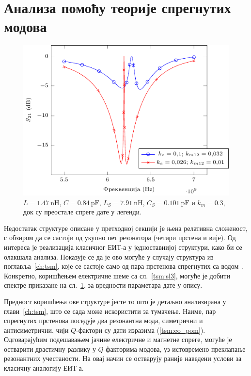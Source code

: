 \documentclass[main.tex]{subfiles}
\begin{document}
\section{Анализа помоћу теорије спрегнутих модова}%
\label{sec:analiza_pomotshu_teorije_spregnutikh_modova}

\begin{figure}[h]
    \centering
    \includegraphics[width=0.8\linewidth]{sl_eit/etran.pdf}
    \caption{$L=\SI{1.47}{\nano\henry}$, $C=\SI{0.84}{\pico\farad}$, $L_S=\SI{7.91}{\nano\henry}$, $C_S=\SI{0.101}{\pico\farad}$ и $k_m=\num{0.3}$, док су преостале спреге дате у легенди.}
    \label{fig:sl_eit/etran}
\end{figure}
Недостатак структуре описане у претходној секцији је њена релативна сложеност, с обзиром да се састоји од укупно пет резонатора (четири прстена и вије). Од интереса је реализација класичног ЕИТ-а у једноставнијој структури, како би се олакшала анализа. Показује се да је ово могуће у случају структура из поглавља~\ref{ch:tsm}, које се састоје само од пара прстенова спрегнутих са водом~\cite{etran:2016}. Конкретно, коришћењем електричне шеме са сл.~\ref{tsm:sl3}, могуће је добити спектре приказане на сл.~\ref{fig:sl_eit/etran}, за вредности параметара дате у опису.

Предност коришћења ове структуре јесте то што је детаљно анализирана у глави~\ref{ch:tsm}, што се сада може искористити за тумачење. Наиме, пар спрегнутих прстенова поседује два резонантна мода, симетрични и антисиметрични, чији $Q$-фактори су дати изразима (\ref{tsm:eo_pom}). Одговарајућим подешавањем јачине електричне и магнетне спреге, могуће је остварити драстичну разлику у $Q$-факторима модова, уз истовремено преклапање резонантних учестаности. На овај начин се остварују раније наведени услови за класичну аналогију ЕИТ-а.
\end{document}
